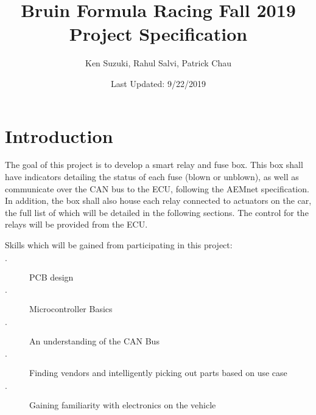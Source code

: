 \documentclass[12pt,letterpaper]{article}
\title{Bruin Formula Racing Fall 2019 Project Specification}
\author{Ken Suzuki, Rahul Salvi, Patrick Chau}
\date{Last Updated: 9/22/2019}
\begin{document}
\maketitle

\section{ Introduction }

The goal of this project is to develop a smart relay and fuse box. This box shall have indicators detailing the status of each fuse (blown or unblown), as well as communicate over the CAN bus to the ECU, following the AEMnet specification. In addition, the box shall also house each relay connected to actuators on the car, the full list of which will be detailed in the following sections. The control for the relays will be provided from the ECU.
\newline

\noindent Skills which will be gained from participating in this project:
 \begin{description}
    \item[$\cdot$] PCB design
    \item[$\cdot$] Microcontroller Basics
    \item[$\cdot$] An understanding of the CAN Bus
    \item[$\cdot$] Finding vendors and intelligently picking out parts based on use case
    \item[$\cdot$] Gaining familiarity with electronics on the vehicle
\end{description}
\end{document}

